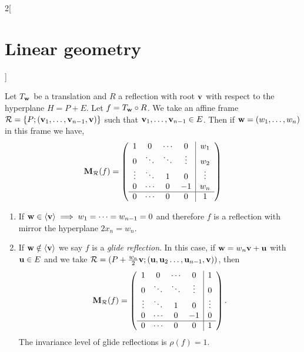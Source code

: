 \documentclass[../../../main.tex]{subfiles}
\begin{document}
\begin{multicols}{2}[\section{Linear geometry}]
\begin{prop}
    \end{prop}
    \begin{prop}
        Let $T_{\boldsymbol{\mathrm{w}}}$ be a translation and $R$ a reflection with root $\boldsymbol{\mathrm{v}}$ with respect to the hyperplane $H=P+E$. Let $f=T_{\boldsymbol{\mathrm{w}}}\circ R$. We take an affine frame $\mathcal{R}=\{P;(\boldsymbol{\mathrm{v}}_1,\ldots,\boldsymbol{\mathrm{v}}_{n-1},\boldsymbol{\mathrm{v}})\}$ such that $\boldsymbol{\mathrm{v}}_1,\ldots,\boldsymbol{\mathrm{v}}_{n-1}\in E$. Then if $\boldsymbol{\mathrm{w}}=(w_1,\ldots,w_n)$ in this frame we have,
        $$\boldsymbol{\mathrm{M}}_\mathcal{R}(f)=\left(
            \begin{array}{cccc|c}
                    1      & 0      & \cdots & 0      & w_1    \\
                    0      & \ddots & \ddots & \vdots & w_2    \\
                    \vdots & \ddots & 1      & 0      & \vdots \\
                    0      & \cdots & 0      & -1     & w_n    \\
                    \hline
                    0      & \cdots & 0      & 0      & 1      \\
                \end{array}\right)$$
        \begin{enumerate}
            \item If $\boldsymbol{\mathrm{w}}\in\langle\boldsymbol{\mathrm{v}}\rangle\implies w_1=\cdots =w_{n-1}=0$ and therefore $f$ is a reflection with mirror the hyperplane $2x_n=w_n$.
            \item If $\boldsymbol{\mathrm{w}}\notin\langle\boldsymbol{\mathrm{v}}\rangle$ we say $f$ is a \textit{glide reflection}. In this case, if $\boldsymbol{\mathrm{w}}=w_n\boldsymbol{\mathrm{v}}+\boldsymbol{\mathrm{u}}$ with $\boldsymbol{\mathrm{u}}\in E$ and we take $\mathcal{R}=(P+\frac{w_n}{2}\boldsymbol{\mathrm{v}};(\boldsymbol{\mathrm{u}},\boldsymbol{\mathrm{u}}_2\ldots, \boldsymbol{\mathrm{u}}_{n-1},\boldsymbol{\mathrm{v}}))$, then $$\boldsymbol{\mathrm{M}}_\mathcal{R}(f)=\left(
                      \begin{array}{cccc|c}
                              1      & 0      & \cdots & 0      & 1      \\
                              0      & \ddots & \ddots & \vdots & 0      \\
                              \vdots & \ddots & 1      & 0      & \vdots \\
                              0      & \cdots & 0      & -1     & 0      \\
                              \hline
                              0      & \cdots & 0      & 0      & 1      \\
                          \end{array}\right).$$ The invariance level of glide reflections is $\rho(f)=1$.
        \end{enumerate}
    \end{prop}

\end{multicols}
\end{document}
